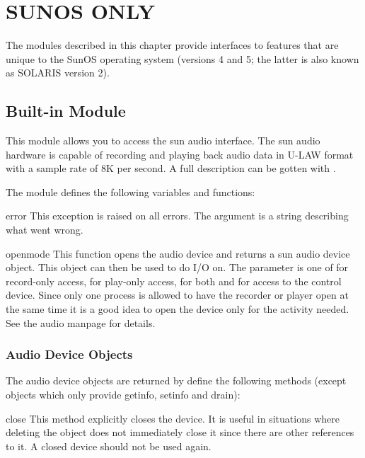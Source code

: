 \chapter{SUNOS ONLY}

The modules described in this chapter provide interfaces to features
that are unique to the SunOS operating system (versions 4 and 5; the
latter is also known as SOLARIS version 2).

\section{Built-in Module }

This module allows you to access the sun audio interface. The sun
audio hardware is capable of recording and playing back audio data
in U-LAW format with a sample rate of 8K per second. A full
description can be gotten with .

The module defines the following variables and functions:

\renewcommand{\indexsubitem}{(in module sunaudiodev)}
\begin{excdesc}{error}
This exception is raised on all errors. The argument is a string
describing what went wrong.
\end{excdesc}

\begin{funcdesc}{open}{mode}
This function opens the audio device and returns a sun audio device
object. This object can then be used to do I/O on. The  parameter
is one of  for record-only access,  for play-only
access,  for both and  for access to the
control device. Since only one process is allowed to have the recorder
or player open at the same time it is a good idea to open the device
only for the activity needed. See the audio manpage for details.
\end{funcdesc}

\subsection{Audio Device Objects}

The audio device objects are returned by  define the
following methods (except  objects which only provide
getinfo, setinfo and drain):

\renewcommand{\indexsubitem}{(audio device method)}

\begin{funcdesc}{close}{}
This method explicitly closes the device. It is useful in situations
where deleting the object does not immediately close it since there
are other references to it. A closed device should not be used again.
\end{funcdesc}

